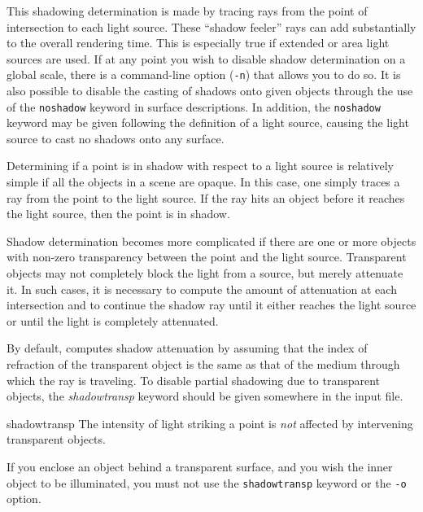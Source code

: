 This shadowing determination is made by tracing rays from the point
of intersection to each light source.  These ``shadow feeler'' rays
can add substantially to the overall rendering time.  This is especially
true if extended or area light sources are used.  If at any point you
wish to disable shadow determination on a global scale, there is
a command-line option ({\tt -n}) that allows you to do so.  It is also
possible
to disable the casting of shadows onto given objects through the use
of the {\tt noshadow} keyword in surface descriptions.  In addition,
the {\tt noshadow} keyword may be given following the definition
of a light source, causing the light source to cast no shadows onto
any surface.

Determining if a point is in shadow with respect to a light source
is relatively simple if all the objects in a scene are opaque.  In
this case, one simply traces a ray from the point to the light source.
If the ray hits an object before it reaches the light source, then
the point is in shadow.

Shadow determination
becomes more complicated if there are one or more objects with
non-zero transparency between the point and the light source.
Transparent objects may not completely block the light from a source,
but merely attenuate it. In such cases, it is necessary to compute the
amount of attenuation at each intersection and to continue
the shadow ray until it either reaches the light source or until
the light is completely attenuated.

By default, \rayshade computes shadow attenuation by assuming
that the index of refraction of the transparent object is the
same as that of the medium through which the ray is traveling.
To disable
partial shadowing due to transparent objects, the {\em shadowtransp}
keyword should be given somewhere in the input file.

\begin{defkey}{shadowtransp}{}
	The intensity of light striking a point is {\em not} affected by
	intervening transparent objects.
\end{defkey}
If you enclose an object behind a transparent surface, and you wish
the inner object to be illuminated, you must not use the {\tt shadowtransp}
keyword or the {\tt -o} option.
